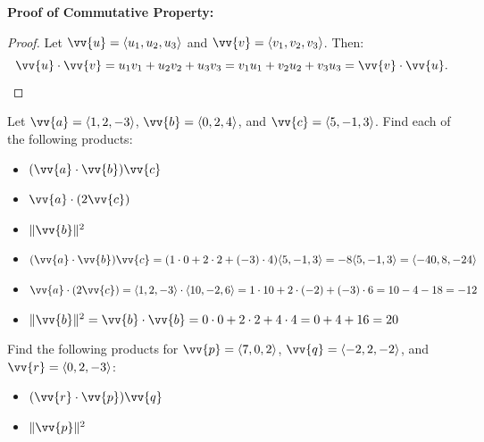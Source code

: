 \documentclass{article}
\begin{document}
\begin{proofbox}
    \textbf{Proof of Commutative Property:}
    \begin{proof}
    Let \(\vv{u} = \langle u_1, u_2, u_3 \rangle\) and \(\vv{v} = \langle v_1, v_2, v_3 \rangle\). Then:
    \[
    \vv{u} \cdot \vv{v} = u_1 v_1 + u_2 v_2 + u_3 v_3 = v_1 u_1 + v_2 u_2 + v_3 u_3 = \vv{v} \cdot \vv{u}.
    \]
    \end{proof}
\end{proofbox}

\begin{examplebox}
    Let \(\vv{a} = \langle 1, 2, -3 \rangle\), \(\vv{b} = \langle 0, 2, 4 \rangle\), and \(\vv{c} = \langle 5, -1, 3 \rangle\). Find each of the following products:
    \begin{itemize}
        \item \((\vv{a} \cdot \vv{b}) \vv{c}\)
        \item \(\vv{a} \cdot (2\vv{c})\)
        \item \(\|\vv{b}\|^2\)
    \end{itemize}

    \begin{solutionbox}
        \begin{itemize}
            \item \((\vv{a} \cdot \vv{b}) \vv{c} = (1 \cdot 0 + 2 \cdot 2 + (-3) \cdot 4) \langle 5, -1, 3 \rangle = -8 \langle 5, -1, 3 \rangle = \langle -40, 8, -24 \rangle\)
            \item \(\vv{a} \cdot (2\vv{c}) = \langle 1, 2, -3 \rangle \cdot \langle 10, -2, 6 \rangle = 1 \cdot 10 + 2 \cdot (-2) + (-3) \cdot 6 = 10 - 4 - 18 = -12\)
            \item \(\|\vv{b}\|^2 = \vv{b} \cdot \vv{b} = 0 \cdot 0 + 2 \cdot 2 + 4 \cdot 4 = 0 + 4 + 16 = 20\)
        \end{itemize}
    \end{solutionbox}
\end{examplebox}

\begin{exercisebox}
    Find the following products for \(\vv{p} = \langle 7, 0, 2 \rangle\), \(\vv{q} = \langle -2, 2, -2 \rangle\), and \(\vv{r} = \langle 0, 2, -3 \rangle\):
    \begin{itemize}
        \item \((\vv{r} \cdot \vv{p}) \vv{q}\)
        \item \(\|\vv{p}\|^2\)
    \end{itemize}
\end{exercisebox}
\end{document}
